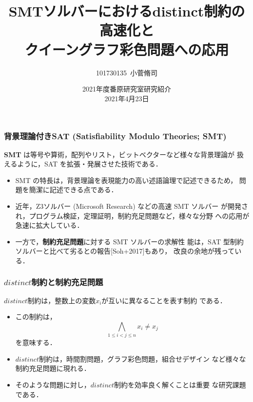 \documentclass [dvipdfmx,11pt]{beamer}
\title[]{SMTソルバーにおけるdistinct制約の高速化と\\クイーングラフ彩色問題への応用}
\author{101730135~小菅脩司}
\institute{番原研究室}
\date{2021年度番原研究室研究紹介\\2021年4月23日}
\newcommand{\distinct}{$distinct$}
\begin{document}
\begin{frame} {}
    \titlepage
\end{frame}

% 

\begin{frame}
  \frametitle{背景理論付きSAT {\large (Satisfiability Modulo Theories; SMT)}}
  \begin{alertblock}{}
    \alert{\bf SMT} は等号や算術，配列やリスト，ビットベクターなど様々な背景理論が
    扱えるように，SAT を拡張・発展させた技術である．
  \end{alertblock}
  \bigskip
  \begin{itemize}
  \item SMT の特長は，背景理論を表現能力の高い述語論理で記述できるため，
    問題を簡潔に記述できる点である．
  \item 近年，Z3ソルバー (Microsoft Research) などの高速 SMT ソルバー
    が開発され，プログラム検証，定理証明，制約充足問題など，様々な分野
    への応用が急速に拡大している．
  \item 一方で，\alert{\bf 制約充足問題}に対する SMT ソルバーの求解性
    能は，SAT 型制約ソルバーと比べて劣るとの報告[Soh+2017]もあり，
    改良の余地が残っている．
  \end{itemize}
\end{frame}
\begin{frame}
  \frametitle{{\distinct}制約と制約充足問題}
  \begin{alertblock}{}
    {\distinct}制約は，整数上の変数$x_{i}$が互いに異なることを表す制約
    である．
  \end{alertblock}
  \begin{itemize}
  \item この制約は，
    $$\bigwedge_{1 \leq i < j \leq n} x_i \neq x_j$$
    を意味する．
  \item {\distinct}制約は，時間割問題，グラフ彩色問題，組合せデザイン
    など様々な制約充足問題に現れる．
  \item そのような問題に対し，{\distinct}制約を効率良く解くことは重要
    な研究課題である．
  \end{itemize}
\end{frame}
\end{document}
